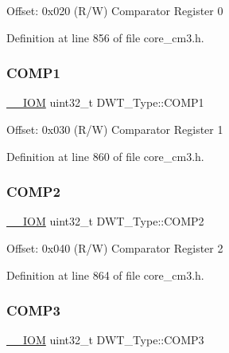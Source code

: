 Offset\+: 0x020 (R/W) Comparator Register 0 

Definition at line 856 of file core\+\_\+cm3.\+h.

\mbox{\label{struct_d_w_t___type_a38714af6b7fa7c64d68f5e1efbe7a931}} 
\subsubsection{\texorpdfstring{C\+O\+M\+P1}{COMP1}}
{\footnotesize\ttfamily \hyperlink{core__sc300_8h_ab6caba5853a60a17e8e04499b52bf691}{\+\_\+\+\_\+\+I\+OM} uint32\+\_\+t D\+W\+T\+\_\+\+Type\+::\+C\+O\+M\+P1}

Offset\+: 0x030 (R/W) Comparator Register 1 

Definition at line 860 of file core\+\_\+cm3.\+h.

\mbox{\label{struct_d_w_t___type_a5ae6dde39989f27bae90afc2347deb46}} 
\subsubsection{\texorpdfstring{C\+O\+M\+P2}{COMP2}}
{\footnotesize\ttfamily \hyperlink{core__sc300_8h_ab6caba5853a60a17e8e04499b52bf691}{\+\_\+\+\_\+\+I\+OM} uint32\+\_\+t D\+W\+T\+\_\+\+Type\+::\+C\+O\+M\+P2}

Offset\+: 0x040 (R/W) Comparator Register 2 

Definition at line 864 of file core\+\_\+cm3.\+h.

\mbox{\label{struct_d_w_t___type_a85eb73d1848ac3f82d39d6c3e8910847}} 
\subsubsection{\texorpdfstring{C\+O\+M\+P3}{COMP3}}
{\footnotesize\ttfamily \hyperlink{core__sc300_8h_ab6caba5853a60a17e8e04499b52bf691}{\+\_\+\+\_\+\+I\+OM} uint32\+\_\+t D\+W\+T\+\_\+\+Type\+::\+C\+O\+M\+P3}

